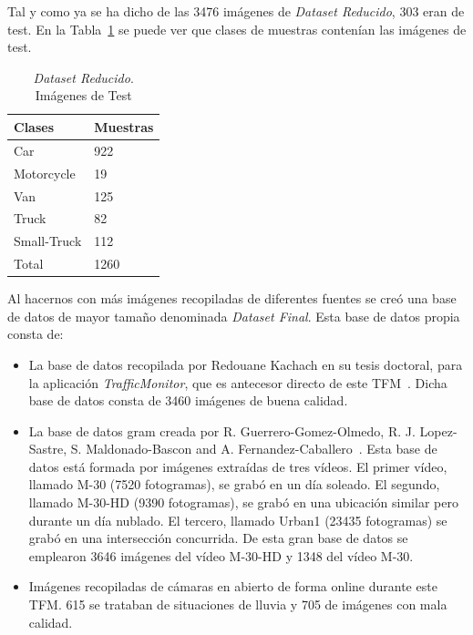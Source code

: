 Tal y como ya se ha dicho de las 3476 imágenes de \textit{Dataset Reducido}, 303 eran de test. En la Tabla~\ref{tabla_datos_primera_evaluacion} se puede ver que clases de muestras contenían las imágenes de test.

\begin{table}[H]
\begin{center}
\begin{tabular}{|l|l|}
\hline
Clases & Muestras \\
\hline \hline
Car & 922 \\ \hline
Motorcycle & 19 \\ \hline
Van & 125 \\ \hline
Truck & 82 \\ \hline
Small-Truck & 112 \\ \hline
Total & 1260 \\ \hline
\end{tabular}
\caption{\textit{Dataset Reducido}. Imágenes de Test}
\label{tabla_datos_primera_evaluacion}
\end{center}
\end{table}

Al hacernos con más imágenes recopiladas de diferentes fuentes se creó una base de datos de mayor tamaño denominada \textit{Dataset Final}. Esta base de datos propia consta de:
\begin{itemize}
    \item La base de datos recopilada por Redouane Kachach en su tesis doctoral, para la aplicación \textit{TrafficMonitor}, que es antecesor directo de este TFM~\cite{traffic_monitor_lab}. Dicha base de datos consta de 3460 imágenes de buena calidad.
    \item La base de datos \acrfull{gram} creada por R. Guerrero-Gomez-Olmedo, R. J. Lopez-Sastre, S. Maldonado-Bascon and A. Fernandez-Caballero~\cite{guerrero2013iwinac}. Esta base de datos está formada por imágenes extraídas de tres vídeos. El primer vídeo, llamado M-30 (7520 fotogramas), se grabó en un día soleado. El segundo, llamado M-30-HD (9390 fotogramas), se grabó en una ubicación similar pero durante un día nublado. El tercero, llamado Urban1 (23435 fotogramas) se grabó en una intersección concurrida. De esta gran base de datos se emplearon 3646 imágenes del vídeo M-30-HD y 1348 del vídeo M-30.
    \item Imágenes recopiladas de cámaras en abierto de forma online durante este TFM. 615 se trataban de situaciones de lluvia y 705 de imágenes con mala calidad.
\end{itemize} 

